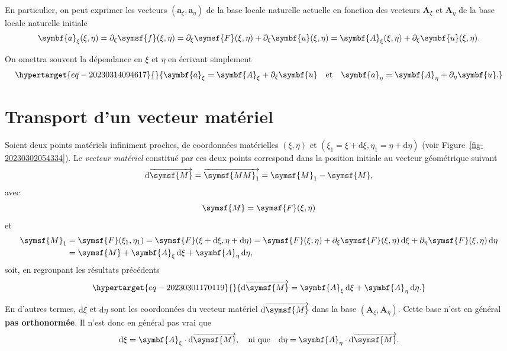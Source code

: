 \documentclass[
  a4paper,
  DIV=11,
  numbers=noendperiod]{scrreprt}
\newcommand{\altvec}[1]{\overrightarrow{#1}}
\newcommand{\D}{{\mathrm d}}
\newcommand{\point}[1]{\symsf{#1}}
\renewcommand{\vec}[1]{\symbf{#1}}
\begin{document}
En particulier, on peut exprimer les vecteurs
\((\vec{a}_\xi, \vec{a}_\eta)\) de la base locale naturelle actuelle en
fonction des vecteurs \(\vec{A}_\xi\) et \(\vec{A}_\eta\) de la base
locale naturelle initiale \[
\vec{a}_\xi(\xi, \eta) = \partial_\xi \point{f}(\xi, \eta) = \partial_\xi \point{F}(\xi, \eta) + \partial_\xi \vec{u}(\xi, \eta) = \vec{A}_\xi(\xi, \eta) + \partial_\xi \vec{u}(\xi, \eta).
\]

On omettra souvent la dépendance en \(\xi\) et \(\eta\) en écrivant
simplement \begin{equation}\protect\hypertarget{eq-20230314094617}{}{
\vec{a}_\xi = \vec{A}_\xi + \partial_\xi \vec{u} \quad \text{et} \quad \vec{a}_\eta = \vec{A}_\eta + \partial_\eta \vec{u}.
}\label{eq-20230314094617}\end{equation}

\hypertarget{transport-dun-vecteur-matuxe9riel}{%
\section{Transport d'un vecteur
matériel}\label{transport-dun-vecteur-matuxe9riel}}

Soient deux points matériels infiniment proches, de coordonnées
matérielles \((\xi, \eta)\) et
\((\xi_1 = \xi + \D\xi, \eta_1 = \eta + \D\eta)\) (voir
Figure~\ref{fig-20230302054334}). Le \emph{vecteur matériel} constitué
par ces deux points correspond dans la position initiale au vecteur
géométrique suivant \[
\D\altvec{\point{M}} = \altvec{\point{MM}_1} = \point{M}_1 - \point{M},
\] avec \[
\point{M} = \point{F}(\xi, \eta)\] et \[
\begin{aligned}[b]
\point{M}_1 &= \point{F}(\xi_1, \eta_1) = \point{F}(\xi + \D\xi, \eta + \D\eta) = \point{F}(\xi, \eta) + \partial_\xi \point{F}(\xi, \eta) \, \D\xi + \partial_\eta \point{F}(\xi, \eta) \, \D\eta\\
&= \point{M} + \vec{A}_\xi \, \D \xi + \vec{A}_\eta \, \D \eta,
\end{aligned}
\] soit, en regroupant les résultats précédents
\begin{equation}\protect\hypertarget{eq-20230301170119}{}{
\D \altvec{\point{M}} = \vec{A}_\xi \, \D \xi + \vec{A}_\eta \, \D \eta.
}\label{eq-20230301170119}\end{equation}

En d'autres termes, \(\D\xi\) et \(\D\eta\) sont les coordonnées du
vecteur matériel \(\D\altvec{\point{M}}\) dans la base
\((\vec{A}_\xi, \vec{A}_\eta)\). Cette base n'est en général \textbf{pas
orthonormée}. Il n'est donc en général pas vrai que \[
\D \xi = \vec{A}_\xi \cdot \D \altvec{\point{M}}, \quad \text{ni que} \quad \D \eta = \vec{A}_\eta \cdot \D \altvec{\point{M}}.
\]
\end{document}
